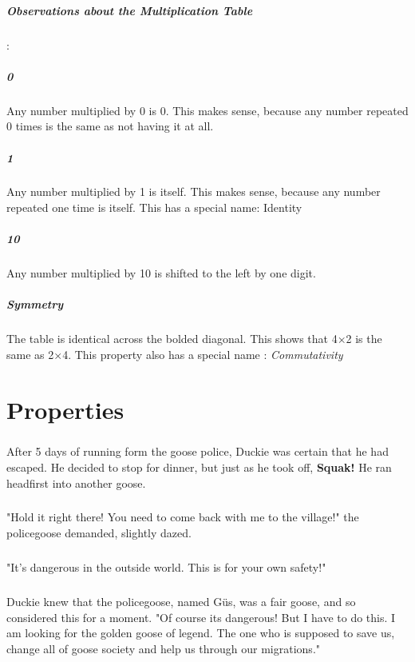 \documentclass[a4paper,11pt ]{book}
\begin{document}
\paragraph{Observations about the Multiplication Table}:
\linebreak
\paragraph{0} Any number multiplied by 0 is 0. This makes sense, because any number
repeated 0 times is the same as not having it at all.
\paragraph{1} Any number multiplied by 1 is itself. This makes sense, because any
number repeated one time is itself. This has a special name: Identity
\paragraph{10} Any number multiplied by 10 is shifted to the left by one digit.
\paragraph{Symmetry} The table is identical across the bolded diagonal. This shows
that 4×2 is the same as 2×4. This property also has a special name :
\textit{Commutativity}
\chapter{Properties}
\paragraph{} After 5 days of running form the goose police, Duckie was certain that he had escaped. He decided to stop for dinner, but just as he took off, \textbf{Squak!} He ran headfirst into another goose. 
\paragraph{} "Hold it right there! You need to come back with me to the village!" the policegoose demanded, slightly dazed. 
\paragraph{} "It's dangerous in the outside world. This is for your own safety!"
\paragraph{} Duckie knew that the policegoose, named Güs, was a fair goose, and so considered this for a moment. "Of course its dangerous! But I have to do this. I am looking for the golden goose of legend. The one who is supposed to save us, change all of goose society and help us through our migrations."
\end{document}
